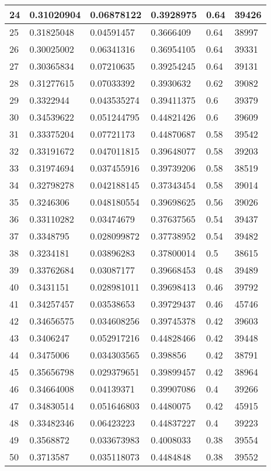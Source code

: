 \begin{longtable}{|l|l|l|l|l|l|}
24 & 0.31020904 & 0.06878122 & 0.3928975 & 0.64 & 39426 \\ \hline 
25 & 0.31825048 & 0.04591457 & 0.3666409 & 0.64 & 38997 \\ \hline 
26 & 0.30025002 & 0.06341316 & 0.36954105 & 0.64 & 39331 \\ \hline 
27 & 0.30365834 & 0.07210635 & 0.39254245 & 0.64 & 39131 \\ \hline 
28 & 0.31277615 & 0.07033392 & 0.3930632 & 0.62 & 39082 \\ \hline 
29 & 0.3322944 & 0.043535274 & 0.39411375 & 0.6 & 39379 \\ \hline 
30 & 0.34539622 & 0.051244795 & 0.44821426 & 0.6 & 39609 \\ \hline 
31 & 0.33375204 & 0.07721173 & 0.44870687 & 0.58 & 39542 \\ \hline 
32 & 0.33191672 & 0.047011815 & 0.39648077 & 0.58 & 39203 \\ \hline 
33 & 0.31974694 & 0.037455916 & 0.39739206 & 0.58 & 38519 \\ \hline 
34 & 0.32798278 & 0.042188145 & 0.37343454 & 0.58 & 39014 \\ \hline 
35 & 0.3246306 & 0.048180554 & 0.39698625 & 0.56 & 39026 \\ \hline 
36 & 0.33110282 & 0.03474679 & 0.37637565 & 0.54 & 39437 \\ \hline 
37 & 0.3348795 & 0.028099872 & 0.37738952 & 0.54 & 39482 \\ \hline 
38 & 0.3234181 & 0.03896283 & 0.37800014 & 0.5 & 38615 \\ \hline 
39 & 0.33762684 & 0.03087177 & 0.39668453 & 0.48 & 39489 \\ \hline 
40 & 0.3431151 & 0.028981011 & 0.39698413 & 0.46 & 39792 \\ \hline 
41 & 0.34257457 & 0.03538653 & 0.39729437 & 0.46 & 45746 \\ \hline 
42 & 0.34656575 & 0.034608256 & 0.39745378 & 0.42 & 39603 \\ \hline 
43 & 0.3406247 & 0.052917216 & 0.44828466 & 0.42 & 39448 \\ \hline 
44 & 0.3475006 & 0.034303565 & 0.398856 & 0.42 & 38791 \\ \hline 
45 & 0.35656798 & 0.029379651 & 0.39899457 & 0.42 & 38964 \\ \hline 
46 & 0.34664008 & 0.04139371 & 0.39907086 & 0.4 & 39266 \\ \hline 
47 & 0.34830514 & 0.051646803 & 0.4480075 & 0.42 & 45915 \\ \hline 
48 & 0.33482346 & 0.06423223 & 0.44837227 & 0.4 & 39223 \\ \hline 
49 & 0.3568872 & 0.033673983 & 0.4008033 & 0.38 & 39554 \\ \hline 
50 & 0.3713587 & 0.035118073 & 0.4484848 & 0.38 & 39552 \\ \hline 
\end{longtable}
